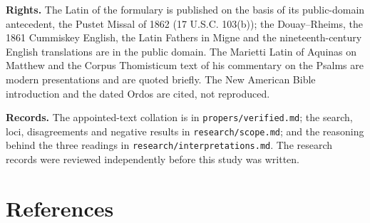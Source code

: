 {\textbf{Rights.} The Latin of the formulary is published on the basis of its
public-domain antecedent, the Pustet Missal of 1862 (17 U.S.C. 103(b));
the Douay--Rheims, the 1861 Cummiskey English, the Latin Fathers in Migne and
the nineteenth-century English translations are in the public domain. The
Marietti Latin of Aquinas on Matthew and the Corpus Thomisticum text of his
commentary on the Psalms are modern presentations and are quoted briefly. The
New American Bible introduction and the dated Ordos are cited, not reproduced.

\textbf{Records.} The appointed-text collation is in \texttt{propers/verified.md};
the search, loci, disagreements and negative results in
\texttt{research/scope.md}; and the reasoning behind the three readings in
\texttt{research/interpretations.md}. The research records were reviewed
independently before this study was written.
\par}

\section*{References}\label{sec:references}


